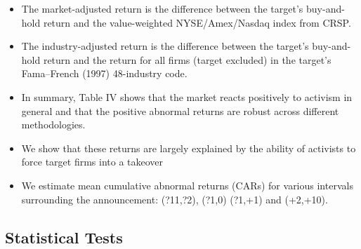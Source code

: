 \documentclass[12pt]{article}
\begin{document}
\begin{itemize}
        \item The market-adjusted return is the difference between the target’s buy-and-hold return and the value-weighted NYSE/Amex/Nasdaq index from CRSP. 
        
        \item The industry-adjusted return is the difference between the target’s buy-and-hold return and the return for all firms (target excluded) in the target’s Fama–French (1997) 48-industry code. \citep{Klein2009}
    
        \item In summary, Table IV shows that the market reacts positively to activism in general and that the positive abnormal returns are robust across different methodologies. \citep{Klein2009}

        \item We show that these returns are largely explained by the ability of activists to force target firms into a takeover \citep{Greenwood2009}

        \item We estimate mean cumulative abnormal returns (CARs) for various intervals surrounding the announcement: (?11,?2), (?1,0) (?1,+1) and (+2,+10). \citep{Akhigbe2007}


    \end{itemize}

\subsection{Statistical Tests}
\end{document}
